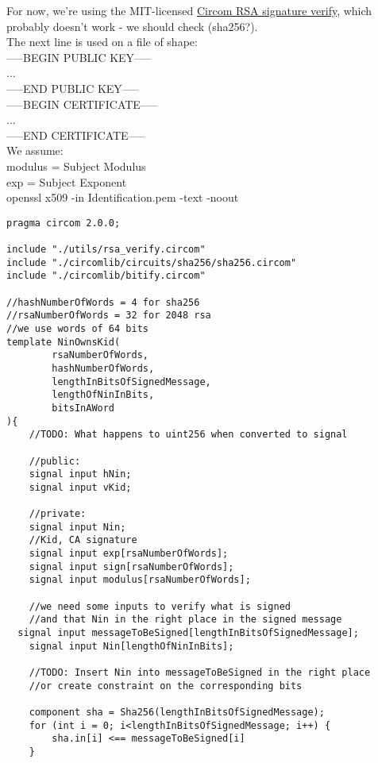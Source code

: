 \documentclass{article}
\begin{document}
\begin{enumerate}[leftmargin=0cm]
For now, we're using the MIT-licensed \href{https://github.com/zkp-application/circom-rsa-verify}{Circom RSA signature verify}, which probably doesn't work - we should check (sha256?). \\

The next line is used on a file of shape:\\
-----BEGIN PUBLIC KEY-----\\
...\\
-----END PUBLIC KEY-----\\
-----BEGIN CERTIFICATE-----\\
...\\
-----END CERTIFICATE-----\\

We assume: \\
	modulus = Subject Modulus\\
	exp = Subject Exponent\\
openssl x509 -in Identification.pem -text -noout\\

\begin{lstlisting}[language=circom]
pragma circom 2.0.0;

include "./utils/rsa_verify.circom"
include "./circomlib/circuits/sha256/sha256.circom"
include "./circomlib/bitify.circom"

//hashNumberOfWords = 4 for sha256
//rsaNumberOfWords = 32 for 2048 rsa
//we use words of 64 bits
template NinOwnsKid(
		rsaNumberOfWords, 
		hashNumberOfWords, 
		lengthInBitsOfSignedMessage,
		lengthOfNinInBits,
		bitsInAWord
){
	//TODO: What happens to uint256 when converted to signal

	//public:
	signal input hNin;
	signal input vKid;

	//private:
	signal input Nin;
	//Kid, CA signature
	signal input exp[rsaNumberOfWords];
	signal input sign[rsaNumberOfWords];
	signal input modulus[rsaNumberOfWords];

	//we need some inputs to verify what is signed
	//and that Nin in the right place in the signed message
  signal input messageToBeSigned[lengthInBitsOfSignedMessage];
	signal input Nin[lengthOfNinInBits];

	//TODO: Insert Nin into messageToBeSigned in the right place
	//or create constraint on the corresponding bits

	component sha = Sha256(lengthInBitsOfSignedMessage);
	for (int i = 0; i<lengthInBitsOfSignedMessage; i++) {
		sha.in[i] <== messageToBeSigned[i]
	}


\end{lstlisting}
\end{enumerate}
\end{document}
